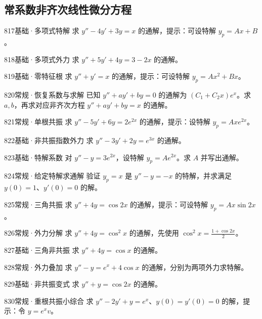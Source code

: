 \subsection{常系数非齐次线性微分方程}
\begin{exercise}{817}{基础·多项式特解}
求 $y''-4y'+3y=x$ 的通解，提示：可设特解 $y_p=Ax+B$。
\end{exercise}
\begin{exercise}{818}{基础·多项式外力}
求 $y''+5y'+4y=3-2x$ 的通解。
\end{exercise}
\begin{exercise}{819}{基础·零特征根}
求 $y''+y'=x$ 的通解，提示：可设特解 $y_p=Ax^2+Bx$。
\end{exercise}
\begin{exercise}{820}{常规·恢复系数与求解}
已知 $y''+ay'+by=0$ 的通解为 $(C_1+C_2x)e^x$。求 $a,b$，再求对应非齐次方程 $y''+ay'+by=x$ 的通解。
\end{exercise}
\begin{exercise}{821}{常规·单根共振}
求 $y''-5y'+6y=2e^{2x}$ 的通解，提示：设特解 $y_p=Axe^{2x}$。
\end{exercise}
\begin{exercise}{822}{基础·非共振指数外力}
求 $y''-3y'+2y=e^{3x}$ 的通解。
\end{exercise}
\begin{exercise}{823}{基础·特解系数}
对 $y''-y=3e^{2x}$，设特解 $y_p=Ae^{2x}$。求 $A$ 并写出通解。
\end{exercise}
\begin{exercise}{824}{常规·给定特解求通解}
验证 $y_p=x$ 是 $y''-y=-x$ 的特解，并求满足 $y(0)=1$、$y'(0)=0$ 的解。
\end{exercise}
\begin{exercise}{825}{常规·三角共振}
求 $y''+4y=\cos2x$ 的通解，提示：可设特解 $y_p=Ax\sin2x$。
\end{exercise}
\begin{exercise}{826}{常规·外力分解}
求 $y''+4y=\cos^2x$ 的通解，先使用 $\cos^2x=\frac{1+\cos2x}{2}$。
\end{exercise}
\begin{exercise}{827}{基础·三角非共振}
求 $y''+4y=\cos x$ 的通解。
\end{exercise}
\begin{exercise}{828}{常规·外力叠加}
求 $y''-y=e^x+4\cos x$ 的通解，分别为两项外力求特解。
\end{exercise}
\begin{exercise}{829}{基础·非共振变式}
求 $y''+y=\cos2x$ 的通解。
\end{exercise}
\begin{exercise}{830}{常规·重根共振小综合}
求 $y''-2y'+y=e^x$、$y(0)=y'(0)=0$ 的解，提示：令 $y=e^xv$。
\end{exercise}
